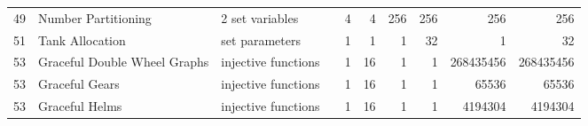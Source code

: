 \begin{sidewaystable}
\begin{center}
\begin{tabular}{r|l|l|l|r|r|r|r|r|r}
 49     &   Number Partitioning                                             &   2 set variables                                                                                           &   \cite{kojic2010integer}                                              & 4                & 4                & 256                                                  & 256                                   & 256                                                         & 256                                                         \\
 51     &   Tank Allocation                                                 &   set parameters                                                                                            &   \cite{schaus2012cardinality}                                         & 1                & 1                & 1                                                    & 32                                    & 1                                                           & 32                                                          \\
 53     &   Graceful Double Wheel Graphs                                    &   injective functions                                                                                       &   \cite{smith2010constraint}                                           & 1                & 16               & 1                                                    & 1                                     & 268435456                                                   & 268435456                                                   \\
 53     &   Graceful Gears                                                  &   injective functions                                                                                       &   \cite{smith2010constraint}                                           & 1                & 16               & 1                                                    & 1                                     & 65536                                                       & 65536                                                       \\
 53     &   Graceful Helms                                                  &   injective functions                                                                                       &   \cite{smith2010constraint}                                           & 1                & 16               & 1                                                    & 1                                     & 4194304                                                     & 4194304                                                     \\

\end{tabular}
\end{center}
\end{sidewaystable}

